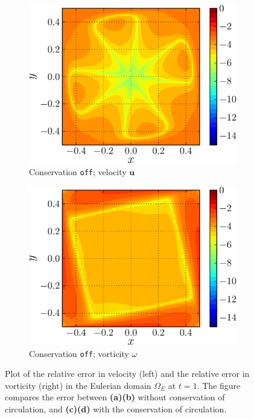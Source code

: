 \begin{figure}[!t]
     \begin{subfigure}[t]{0.45\textwidth}
             \includegraphics[width=\linewidth]{./figures/validation/lambOseent2/lambOseen_fullyCoff_vErrorFinal_compressed-crop.png}
             \caption{Conservation \texttt{off}; velocity $\mathbf{u}$}
             \label{fig:lambOseen_fullyCoff_vErrorFinal}
     \end{subfigure}
     \qquad     
     \begin{subfigure}[t]{0.45\textwidth}
             \includegraphics[width=\linewidth]{./figures/validation/lambOseent2/lambOseen_fullyCoff_wErrorFinal_compressed-crop.png}
             \caption{Conservation \texttt{off}; vorticity $\omega$}
             \label{fig:lambOseen_fullyCoff_wErrorFinal}
     \end{subfigure}  
  
     \caption{Plot of the relative error in velocity (left) and the relative error in vorticity (right) in the Eulerian domain $\Omega_E$ at $t=1$. The figure compares the error between \textbf{(a)}\textbf{(b)} without conservation of circulation, and \textbf{(c)}\textbf{(d)} with the conservation of circulation.}
     \label{fig:lambOseen_conservation_contourf}
	\end{figure}
	
